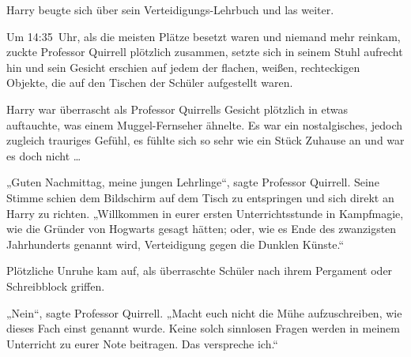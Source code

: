 Harry beugte sich über sein Verteidigungs-Lehrbuch und las weiter.

\later

Um 14:35~Uhr, als die meisten Plätze besetzt waren und niemand mehr reinkam, zuckte Professor Quirrell plötzlich zusammen, setzte sich in seinem Stuhl aufrecht hin und sein Gesicht erschien auf jedem der flachen, weißen, rechteckigen Objekte, die auf den Tischen der Schüler aufgestellt waren.

Harry war überrascht als Professor Quirrells Gesicht plötzlich in etwas auftauchte, was einem Muggel-Fernseher ähnelte. Es war ein nostalgisches, jedoch zugleich trauriges Gefühl, es fühlte sich so sehr wie ein Stück Zuhause an und war es doch nicht …

„Guten Nachmittag, meine jungen Lehrlinge“, sagte Professor Quirrell. Seine Stimme schien dem Bildschirm auf dem Tisch zu entspringen und sich direkt an Harry zu richten.
„Willkommen in eurer ersten Unterrichtsstunde in Kampfmagie, wie die Gründer von Hogwarts gesagt hätten; oder, wie es Ende des zwanzigsten Jahrhunderts genannt wird, Verteidigung gegen die Dunklen Künste.“

Plötzliche Unruhe kam auf, als überraschte Schüler nach ihrem Pergament oder Schreibblock griffen.

„Nein“, sagte Professor Quirrell.
„Macht euch nicht die Mühe aufzuschreiben, wie dieses Fach einst genannt wurde. Keine solch sinnlosen Fragen werden in meinem Unterricht zu eurer Note beitragen. Das verspreche ich.“

